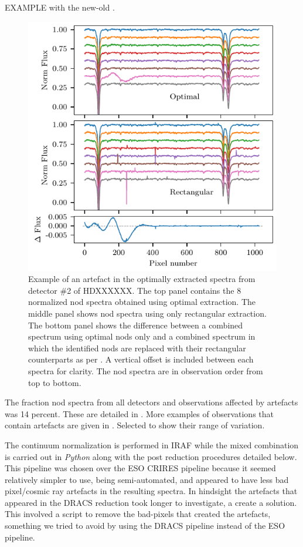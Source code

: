 EXAMPLE with the new-old .
\begin{figure}
    \centering
    \includegraphics[width=\hsize/2]{figures/reduction/bp_plots/Bad_pixel_replacement}
    \caption{Example of an artefact in the optimally extracted spectra from detector \#2 of {\red{} HDXXXXXX}. The top panel contains the 8 normalized nod spectra obtained using optimal extraction. The middle panel shows nod spectra using only rectangular extraction. The bottom panel shows the difference between a combined spectrum using optimal nods only and a combined spectrum in which the identified nods are replaced with their rectangular counterparts as per . A vertical offset is included between each spectra for clarity. The nod spectra are in observation order from top to bottom.}
    \label{fig:badpixelreplacement}
\end{figure}

The fraction nod spectra from all detectors and observations affected by artefacts was 14 percent. These are detailed in . More examples of observations that contain artefacts are given in . Selected to show their range of variation.


The continuum normalization is performed in {IRAF} while the mixed combination is carried out in \emph{Python} along with the post reduction procedures detailed below. This pipeline was chosen over the {ESO} {CRIRES} pipeline because it seemed relatively simpler to use, being semi-automated, and appeared to have less bad pixel/cosmic ray artefacts in the resulting spectra. In hindsight the artefacts that appeared in the {DRACS} reduction took longer to investigate, a create a solution. This involved a script to remove the bad-pixels that created the artefacts, something we tried to avoid by using the {DRACS} pipeline instead of the {ESO} pipeline.

